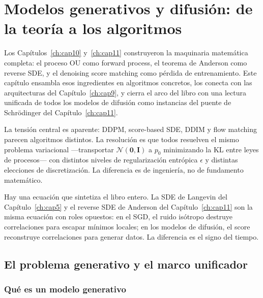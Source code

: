 \chapter{Modelos generativos y difusión: de la teoría a los algoritmos}
\label{ch:cap12}

Los Capítulos~\ref{ch:cap10} y~\ref{ch:cap11} construyeron la maquinaria matemática completa: el proceso
OU como forward process, el teorema de Anderson como reverse SDE, y el denoising
score matching como pérdida de entrenamiento. Este capítulo ensambla esos
ingredientes en algoritmos concretos, los conecta con las arquitecturas del
Capítulo~\ref{ch:cap9}, y cierra el arco del libro con una lectura unificada de todos los
modelos de difusión como instancias del puente de Schrödinger del Capítulo~\ref{ch:cap11}.

La tensión central es aparente: DDPM, score-based SDE, DDIM y flow matching
parecen algoritmos distintos. La resolución es que todos resuelven el mismo
problema variacional —transportar $\mathcal{N}(\bm{0},\bm{I})$ a $p_0$
minimizando la KL entre leyes de procesos— con distintos niveles de
regularización entrópica $\epsilon$ y distintas elecciones de discretización.
La diferencia es de ingeniería, no de fundamento matemático.

Hay una ecuación que sintetiza el libro entero. La SDE de Langevin del
Capítulo~\ref{ch:cap5} y el reverse SDE de Anderson del Capítulo~\ref{ch:cap11} son la misma ecuación
con roles opuestos: en el SGD, el ruido isótropo destruye correlaciones para
escapar mínimos locales; en los modelos de difusión, el score reconstruye
correlaciones para generar datos. La diferencia es el signo del tiempo.

\section{El problema generativo y el marco unificador}
\label{sec:generativo_marco}

\subsection{Qué es un modelo generativo}
\label{subsec:modelo_generativo}

